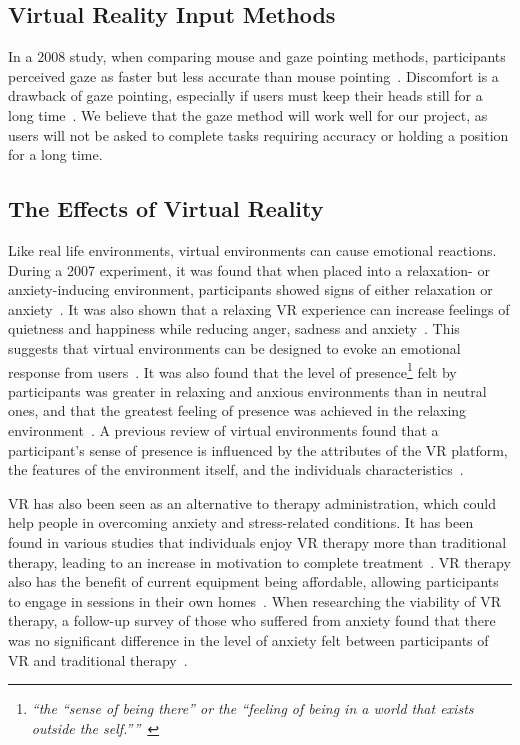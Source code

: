 \documentclass{sigchi}
\newcommand{\inlinequote}[1]{\textit{``#1''}}
\begin{document}
\subsection{Virtual Reality Input Methods}
In a 2008 study, when comparing mouse and gaze pointing methods, participants perceived gaze as faster but less accurate than mouse pointing~\cite{mateo2008gaze}. Discomfort is a drawback of gaze pointing, especially if users must keep their heads still for a long time~\cite{mateo2008gaze}. We believe that the gaze method will work well for our project, as users will not be asked to complete tasks requiring accuracy or holding a position for a long time.

\subsection{The Effects of Virtual Reality}
Like real life environments, virtual environments can cause emotional reactions. During a 2007 experiment, it was found that when placed into a relaxation- or anxiety-inducing environment, participants showed signs of either relaxation or anxiety~\cite{riva2007affective}. It was also shown that a relaxing VR experience can increase feelings of quietness and happiness while reducing anger, sadness and anxiety~\cite{riva2007affective}. This suggests that virtual environments can be designed to evoke an emotional response from users~\cite{riva2007affective,wiederhold2006evaluation}. 
It was also found that the level of presence\footnote{\inlinequote{the \inlinequote{sense of being there} or the \inlinequote{feeling of being in a world that exists outside the self.}}~\cite{riva2007affective}} felt by participants was greater in relaxing and anxious environments than in neutral ones, and that the greatest feeling of presence was achieved in the relaxing environment~\cite{riva2007affective}. A previous review of virtual environments found that a participant's sense of presence is influenced by the attributes of the VR platform, the features of the environment itself, and the individuals characteristics~\cite{nash2000review}.

VR has also been seen as an alternative to therapy administration, which could help people in overcoming anxiety and stress-related conditions. It has been found in various studies that individuals enjoy VR therapy more than traditional therapy, leading to an increase in motivation to complete treatment~\cite{kizony2003adapting,morel2015advantages}. VR therapy also has the benefit of current equipment being affordable, allowing participants to engage in sessions in their own homes~\cite{morel2015advantages}. When researching the viability of VR therapy, a follow-up survey of those who suffered from anxiety found that there was no significant difference in the level of anxiety felt between participants of VR and traditional therapy~\cite{safir2011virtual}.
\end{document}

